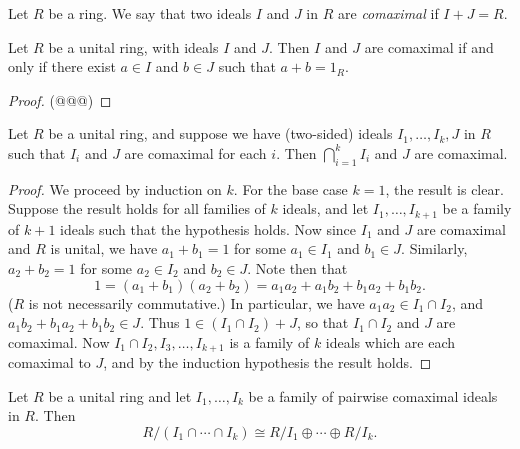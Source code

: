 \begin{dfn}
Let \(R\) be a ring.
We say that two ideals \(I\) and \(J\) in \(R\) are \emph{comaximal} if \(I+J = R\).
\end{dfn}

\begin{prop}
Let \(R\) be a unital ring, with ideals \(I\) and \(J\).
Then \(I\) and \(J\) are comaximal if and only if there exist \(a \in I\) and \(b \in J\) such that \(a + b = 1_R\).
\end{prop}

\begin{proof}
(@@@)
\end{proof}

\begin{prop}
Let \(R\) be a unital ring, and suppose we have (two-sided) ideals \(I_1, \ldots, I_k, J\) in \(R\) such that \(I_i\) and \(J\) are comaximal for each \(i\).
Then \(\bigcap_{i=1}^k I_i\) and \(J\) are comaximal.
\end{prop}

\begin{proof}
We proceed by induction on \(k\).
For the base case \(k = 1\), the result is clear.
Suppose the result holds for all families of \(k\) ideals, and let \(I_1, \ldots, I_{k+1}\) be a family of \(k+1\) ideals such that the hypothesis holds.
Now since \(I_1\) and \(J\) are comaximal and \(R\) is unital, we have \(a_1 + b_1 = 1\) for some \(a_1 \in I_1\) and \(b_1 \in J\).
Similarly, \(a_2 + b_2 = 1\) for some \(a_2 \in I_2\) and \(b_2 \in J\).
Note then that \[ 1 = (a_1 + b_1)(a_2 + b_2) = a_1a_2 + a_1b_2 + b_1a_2 + b_1b_2. \]
(\(R\) is not necessarily commutative.)
In particular, we have \(a_1a_2 \in I_1 \cap I_2\), and \(a_1b_2 + b_1a_2 + b_1b_2 \in J\).
Thus \(1 \in (I_1 \cap I_2) + J\), so that \(I_1 \cap I_2\) and \(J\) are comaximal.
Now \(I_1 \cap I_2, I_3, \ldots, I_{k+1}\) is a family of \(k\) ideals which are each comaximal to \(J\), and by the induction hypothesis the result holds.
\end{proof}

\begin{prop}
Let \(R\) be a unital ring and let \(I_1, \ldots, I_k\) be a family of pairwise comaximal ideals in \(R\).
Then \[ R/(I_1 \cap \cdots \cap I_k) \cong R/I_1 \oplus \cdots \oplus R/I_k. \]
\end{prop}

